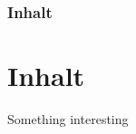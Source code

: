 \begin{frame}
\frametitle{Inhalt}
\section{Inhalt}
Something interesting\cite{aixbench}

\end{frame}